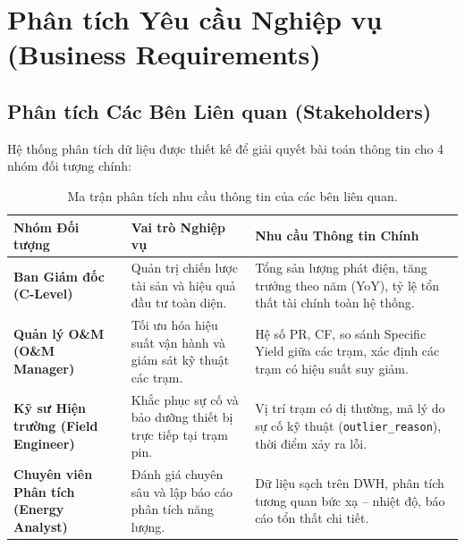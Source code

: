 \documentclass[12pt, a4paper]{report}
\begin{document}
\section{Phân tích Yêu cầu Nghiệp vụ (Business Requirements)}
\label{sec:yeucau_nghiepvu}

\subsection{Phân tích Các Bên Liên quan (Stakeholders)}
Hệ thống phân tích dữ liệu được thiết kế để giải quyết bài toán thông tin cho 4 nhóm đối tượng chính:

\begin{table}[H]
\centering
\small
\renewcommand{\arraystretch}{1.25}
\begin{tabularx}{\textwidth}{@{} l p{4.5cm} X @{}}
\toprule
\textbf{Nhóm Đối tượng} & \textbf{Vai trò Nghiệp vụ} & \textbf{Nhu cầu Thông tin Chính} \\
\midrule
\textbf{Ban Giám đốc (C-Level)} & 
Quản trị chiến lược tài sản và hiệu quả đầu tư toàn diện. & 
Tổng sản lượng phát điện, tăng trưởng theo năm (YoY), tỷ lệ tổn thất tài chính toàn hệ thống. \\
\midrule
\textbf{Quản lý O\&M (O\&M Manager)} & 
Tối ưu hóa hiệu suất vận hành và giám sát kỹ thuật các trạm. & 
Hệ số PR, CF, so sánh Specific Yield giữa các trạm, xác định các trạm có hiệu suất suy giảm. \\
\midrule
\textbf{Kỹ sư Hiện trường (Field Engineer)} & 
Khắc phục sự cố và bảo dưỡng thiết bị trực tiếp tại trạm pin. & 
Vị trí trạm có dị thường, mã lý do sự cố kỹ thuật (\texttt{outlier\_reason}), thời điểm xảy ra lỗi. \\
\midrule
\textbf{Chuyên viên Phân tích (Energy Analyst)} & 
Đánh giá chuyên sâu và lập báo cáo phân tích năng lượng. & 
Dữ liệu sạch trên DWH, phân tích tương quan bức xạ -- nhiệt độ, báo cáo tổn thất chi tiết. \\
\bottomrule
\end{tabularx}
\caption{Ma trận phân tích nhu cầu thông tin của các bên liên quan.}
\label{tab:stakeholder_matrix}
\end{table}
\end{document}

